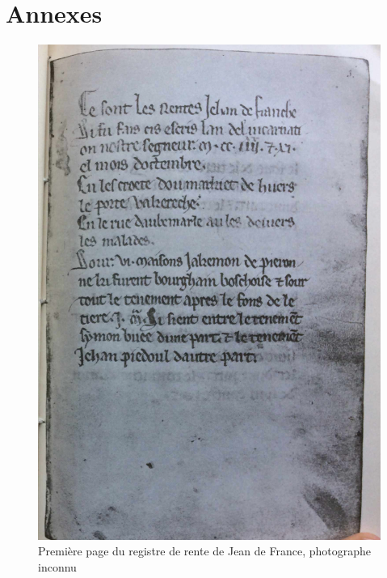 \chapter{Annexes}
\begin{figure}[ht] %
    \centering
    \includegraphics[scale=1]{5.Appendix/Img/escris.png} 
    \caption{Première page du registre de rente de Jean de France, photographe inconnu}
\end{figure}
\listoffigures
\listoftables
\nocite{*}
\printbibliography